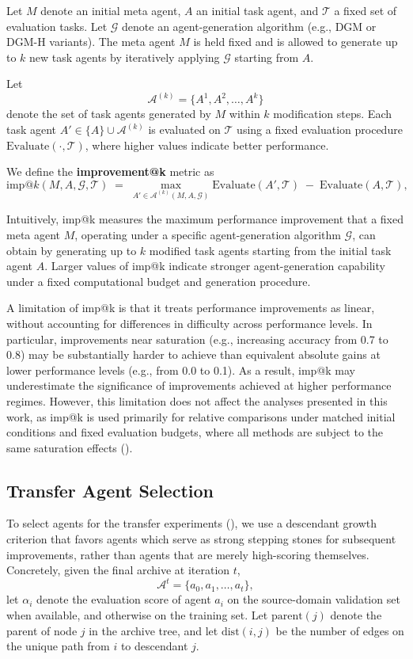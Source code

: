 \documentclass[]{fairmeta}
\begin{document}
Let $M$ denote an initial meta agent, $A$ an initial task agent, and $\mathcal{T}$ a fixed set of evaluation tasks. Let $\mathcal{G}$ denote an agent-generation algorithm (e.g., DGM or DGM-H variants). The meta agent $M$ is held fixed and is allowed to generate up to $k$ new task agents by iteratively applying $\mathcal{G}$ starting from $A$.

Let
\[
\mathcal{A}^{(k)} = \{A^{1}, A^{2}, \dots, A^{k}\}
\]
denote the set of task agents generated by $M$ within $k$ modification steps. Each task agent
$A' \in \{A\} \cup \mathcal{A}^{(k)}$ is evaluated on $\mathcal{T}$ using a fixed evaluation
procedure $\mathrm{Evaluate}(\cdot, \mathcal{T})$, where higher values indicate better performance.

We define the \textbf{improvement@k} metric as
\[
\mathrm{imp@}k(M, A, \mathcal{G}, \mathcal{T})
\;=\;
\max_{A' \in \mathcal{A}^{(k)}(M, A, \mathcal{G})}
\mathrm{Evaluate}(A', \mathcal{T})
\;-\;
\mathrm{Evaluate}(A, \mathcal{T}),
\]

Intuitively, imp@k measures the maximum performance improvement that a fixed meta agent $M$, operating under a specific agent-generation algorithm $\mathcal{G}$, can obtain by generating up to $k$ modified task agents starting from the initial task agent $A$. Larger values of imp@k indicate stronger agent-generation capability under a fixed computational budget and generation procedure.

A limitation of imp@k is that it treats performance improvements as linear, without accounting for differences in difficulty across performance levels. In particular, improvements near saturation (e.g., increasing accuracy from 0.7 to 0.8) may be substantially harder to achieve than equivalent absolute gains at lower performance levels (e.g., from 0.0 to 0.1). As a result, imp@k may underestimate the significance of improvements achieved at higher performance regimes. However, this limitation does not affect the analyses presented in this work, as imp@k is used primarily for relative comparisons under matched initial conditions and fixed evaluation budgets, where all methods are subject to the same saturation effects ().

\subsection{Transfer Agent Selection}
\label{app:transfer-selection}

To select agents for the transfer experiments (), we use a descendant growth criterion that favors agents which serve as strong stepping stones for subsequent improvements, rather than agents that are merely high-scoring themselves.
Concretely, given the final archive at iteration \(t\),
\[
\mathcal{A}^t = \{a_0, a_1, \dots, a_t\},
\]
let \(\alpha_i\) denote the evaluation score of agent \(a_i\) on the source-domain validation set when available, and otherwise on the training set.
Let \(\mathrm{parent}(j)\) denote the parent of node \(j\) in the archive tree, and let \(\mathrm{dist}(i,j)\) be the number of edges on the unique path from \(i\) to descendant \(j\).
\end{document}

